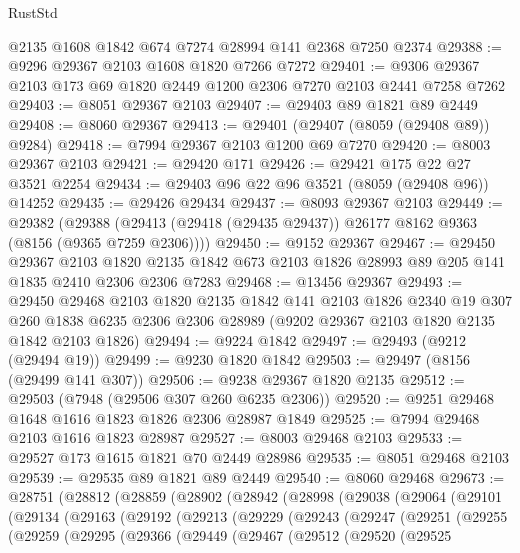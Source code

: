 \begin{lexlean}{RustStd}
\begin{coremodule}
{\begin{coremodule}
{{{{{{{{{{{{{{{{{{{{{{{{{{{{{{{{{{    @2135
    @1608
    @1842
    @674
    @7274
    @28994
    @141
    @2368
    @7250
    @2374
@29388 := @9296 @29367 @2103 @1608 @1820 @7266 @7272
@29401 := @9306 @29367 @2103 @173 @69 @1820 @2449 @1200 @2306 @7270 @2103 @2441 @7258 @7262
@29403 := @8051 @29367 @2103
@29407 := @29403 @89 @1821 @89 @2449
@29408 := @8060 @29367
@29413 := @29401 (@29407 (@8059 (@29408 @89)) @9284)
@29418 := @7994 @29367 @2103 @1200 @69 @7270
@29420 := @8003 @29367 @2103
@29421 := @29420 @171
@29426 := @29421 @175 @22 @27 @3521 @2254
@29434 := @29403 @96 @22 @96 @3521 (@8059 (@29408 @96)) @14252
@29435 := @29426 @29434
@29437 := @8093 @29367 @2103
@29449 := @29382
    (@29388 (@29413 (@29418 (@29435 @29437)) @26177 @8162 @9363 (@8156 (@9365 @7259 @2306))))
@29450 := @9152 @29367
@29467 := @29450
    @29367
    @2103
    @1820
    @2135
    @1842
    @673
    @2103
    @1826
    @28993
    @89
    @205
    @141
    @1835
    @2410
    @2306
    @2306
    @7283
@29468 := @13456 @29367
@29493 := @29450
    @29468
    @2103
    @1820
    @2135
    @1842
    @141
    @2103
    @1826
    @2340
    @19
    @307
    @260
    @1838
    @6235
    @2306
    @2306
    @28989
    (@9202 @29367 @2103 @1820 @2135 @1842 @2103 @1826)
@29494 := @9224 @1842
@29497 := @29493 (@9212 (@29494 @19))
@29499 := @9230 @1820 @1842
@29503 := @29497 (@8156 (@29499 @141 @307))
@29506 := @9238 @29367 @1820 @2135
@29512 := @29503 (@7948 (@29506 @307 @260 @6235 @2306))
@29520 := @9251 @29468 @1648 @1616 @1823 @1826 @2306 @28987 @1849
@29525 := @7994 @29468 @2103 @1616 @1823 @28987
@29527 := @8003 @29468 @2103
@29533 := @29527 @173 @1615 @1821 @70 @2449 @28986
@29535 := @8051 @29468 @2103
@29539 := @29535 @89 @1821 @89 @2449
@29540 := @8060 @29468
@29673 := @28751
    (@28812
      (@28859
        (@28902
          (@28942
            (@28998
              (@29038
                (@29064
                  (@29101
                    (@29134
                      (@29163
                        (@29192
                          (@29213
                            (@29229
                              (@29243
                                (@29247
                                  (@29251
                                    (@29255
                                      (@29259
                                        (@29295
                                          (@29366
                                            (@29449
                                              (@29467
                                                (@29512
                                                  (@29520
                                                    (@29525
}}}}}}}}}}}}}}}}}}}}}}}}}}}}}}}}}}
\end{coremodule}}
\end{coremodule}
\end{lexlean}
